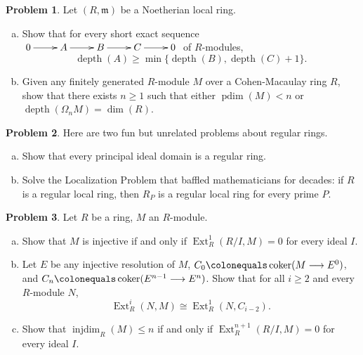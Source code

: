 \documentclass[11pt]{article}
\DeclareMathOperator{\coker}{coker}
\DeclareMathOperator{\Ext}{Ext}
\DeclareMathOperator{\depth}{depth}
\DeclareMathOperator{\pdim}{pdim}
\DeclareMathOperator{\injdim}{inj dim}
\newcommand{\m}{\mathfrak{m}}
\theoremstyle{definition}
\newtheorem{problem}{Problem}
\begin{document}
\begin{problem}
	Let $(R,\m)$ be a Noetherian local ring.
	\begin{enumerate}[a)]
		\item Show that for every short exact sequence $\xymatrix{0 \ar[r] & A \ar[r] & B \ar[r] & C \ar[r] & 0}$ of $R$-modules,
		$$\depth(A) \geqslant \min \lbrace \depth(B), \depth(C) + 1 \rbrace.$$
		\item Given any finitely generated $R$-module $M$ over a Cohen-Macaulay ring $R$, show that there exists $n \geqslant 1$ such that either $\pdim(M) < n$ or $\depth(\Omega_n M) = \dim(R)$.
	\end{enumerate}
\end{problem}

\vfill

\begin{problem} Here are two fun but unrelated problems about regular rings.
	\begin{enumerate}[a)]
	\item Show that every principal ideal domain is a regular ring.
	\item Solve the Localization Problem that baffled mathematicians for decades: if $R$ is a regular local ring, then $R_P$ is a regular local ring for every prime $P$.
	\end{enumerate}
\end{problem}

\newpage

\begin{problem}
	Let $R$ be a ring, $M$ an $R$-module.
	\begin{enumerate}[a)]
		\item Show that $M$ is injective if and only if $\Ext_R^1(R/I,M) = 0$ for every ideal $I$.
		\item Let $E$ be any injective resolution of $M$, $C_0 \colonequals \coker(M \longrightarrow E^0)$, and $C_n \colonequals \coker(E^{n-1} \longrightarrow E^n)$. Show that for all $i \geqslant 2$ and every $R$-module $N$,
		$$\Ext^i_R(N,M) \cong \Ext^1_R(N,C_{i-2}).$$
		\item Show that $\injdim_R(M) \leqslant n$ if and only if $\Ext_R^{n+1}(R/I,M) = 0$ for every ideal $I$.
	\end{enumerate}
\end{problem}


\
\end{document}
